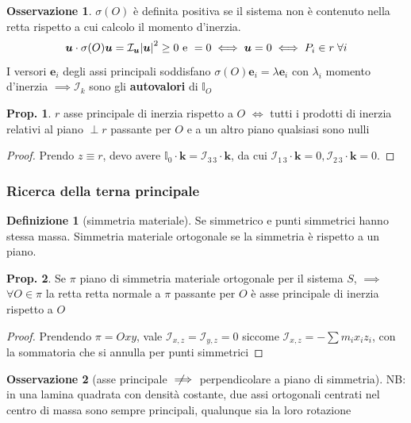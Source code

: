 \documentclass[a4paper,10pt]{article}
\theoremstyle{definition}
\newcommand{\bv}{\boldsymbol} %
\newcommand{\notimplies}{%
\mathrel{{\ooalign{\hidewidth$\not\phantom{=}$\hidewidth\cr$\implies$}}}}  %
\theoremstyle{indentdefinition}
\newtheorem{defn}{Definizione}[section]
\theoremstyle{indenttheorem}
\newtheorem{prop}{Prop.}
\theoremstyle{myremark}
\newtheorem*{rem*}{Osservazione}
\theoremstyle{indentgeneral}
\begin{document}
\begin{rem*}
    $\sigma (O)$ è definita positiva se il sistema non è contenuto nella retta rispetto a cui calcolo il momento d'inerzia.
    $$\bv{u}\cdot\sigma (O)\bv{u}=\mathcal{I}_{\bv{u}}\abs{\bv{u}}^2\ge0 \text{ e }=0\iff\bv{u}=0\iff P_i\in r\;\forall i$$
    I versori $\bv{e}_i$ degli assi principali soddisfano $\sigma(O)\bv{e}_i=\lambda\bv{e}_i$ con $\lambda_i$ momento d'inerzia $\implies\mathcal{I}_k$ sono gli \textbf{autovalori} di $\mathbb{I}_O$
\end{rem*}

\begin{prop}
$r$ asse principale di inerzia rispetto a $O$ $\Longleftrightarrow$
tutti i prodotti di inerzia relativi al piano $\perp r$ passante
per $O$ e a un altro piano qualsiasi sono nulli
\end{prop}

\begin{proof}
Prendo $z\equiv r$, devo avere $\mathbb{I}_{0}\cdot\boldsymbol{k}=\mathcal{I}_{3\,3}\cdot\boldsymbol{k}$,
da cui $\mathcal{I}_{1\,3}\cdot\boldsymbol{k}=0,\mathcal{I}_{2\,3}\cdot\boldsymbol{k}=0$.
\end{proof}

\subsubsection{Ricerca della terna principale}

\begin{defn}[simmetria materiale]
Se simmetrico e punti simmetrici hanno stessa massa. Simmetria materiale
ortogonale se la simmetria è rispetto a un piano.
\end{defn}

\begin{prop}
Se $\pi$ piano di simmetria materiale ortogonale per il sistema $S$,
$\implies$ $\forall O\in\pi$ la retta retta normale a $\pi$ passante
per $O$ è asse principale di inerzia rispetto a $O$
\end{prop}

\begin{proof}
Prendendo $\pi=Oxy$, vale $\mathcal{I}_{x,z}=\mathcal{I}_{y,z}=0$
siccome $\mathcal{I}_{x,z}=-\sum m_{i}x_{i}z_{i}$, con la sommatoria
che si annulla per punti simmetrici
\end{proof}

\begin{rem*}[asse principale $\notimplies$ perpendicolare a piano di simmetria]
    NB: in una lamina quadrata con densità costante, due assi ortogonali centrati nel centro di massa sono sempre principali, qualunque sia la loro rotazione
\end{rem*}
\end{document}
